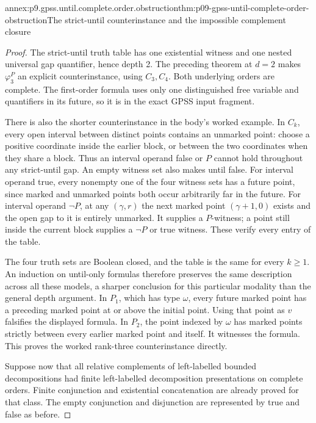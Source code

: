 \begin{annexitem}{annex:p9.gpss.until.complete.order.obstruction}{thm:p09-gpss-until-complete-order-obstruction}{The strict-until counterinstance and the impossible complement closure}
\begin{proof}
The strict-until truth
table has one
existential witness
and one nested
universal gap
quantifier, hence
depth 2.
The preceding
theorem at \(d=2\)
makes \(\varphi_3^P\)
an explicit
counterinstance,
using \(C_3,C_4\).
Both underlying
orders are complete.
The first-order
formula uses only
one distinguished
free variable
and quantifiers
in its future,
so it is in
the exact GPSS
input fragment.

There is also the shorter
counterinstance in the
body's worked example.
In \(C_k\), every open
interval between distinct
points contains an
unmarked point: choose
a positive coordinate
inside the earlier
block, or between the
two coordinates when
they share a block.
Thus an interval
operand false or \(P\)
cannot hold throughout
any strict-until gap.
An empty witness set
also makes until false.
For interval operand
true, every nonempty
one of the four witness
sets has a future
point, since marked
and unmarked points
both occur arbitrarily
far in the future.
For interval operand
\(\neg P\), at any
\((\gamma,r)\) the
next marked point
\((\gamma+1,0)\)
exists and the open
gap to it is entirely
unmarked. It supplies
a \(P\)-witness; a
point still inside
the current block
supplies a \(\neg P\)
or true witness.
These verify every
entry of the table.

The four truth sets
are Boolean closed,
and the table is
the same for every
\(k\geq1\).
An induction on
until-only formulas
therefore preserves
the same description
across all these
models, a sharper
conclusion for this
particular modality
than the general
depth argument.
In \(P_1\), which
has type \(\omega\),
every future marked
point has a preceding
marked point at
or above the initial
point. Using that
point as \(v\)
falsifies the
displayed formula.
In \(P_2\), the
point indexed by
\(\omega\) has
marked points
strictly between
every earlier
marked point
and itself.
It witnesses the
formula. This
proves the
worked rank-three
counterinstance
directly.

Suppose now that
all relative
complements of
left-labelled
bounded decompositions
had finite
left-labelled
decomposition
presentations
on complete
orders. Finite
conjunction and
existential
concatenation
are already
proved for
that class.
The empty
conjunction
and disjunction
are represented
by true and
false as
before.


\end{proof}
\end{annexitem}
